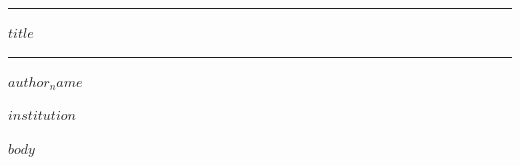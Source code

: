 \documentclass[11pt,letterpaper]{article}
\begin{document}
\begin{center}
\rule{\textwidth}{2.2pt}
\vspace{0.75em}

{\LARGE\bfseries $title$ \par}

\vspace{0.85em}
\rule{\textwidth}{0.8pt}
\vspace{1.35em}

{\large\bfseries $author_name$\footnotemark \par}
$institution$\par
\vspace{1.2em}
\end{center}

\begin{abstract}
\noindent $abstract$
\end{abstract}

\vspace{0.6em}

$body$
\end{document}
